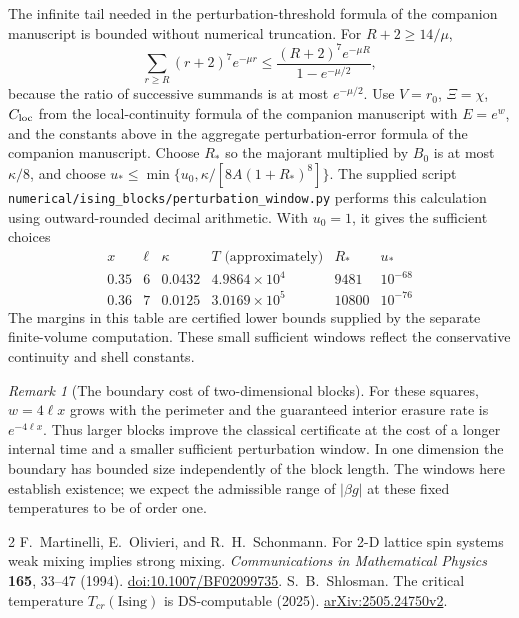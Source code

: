 \documentclass[11pt,a4paper]{article}
\theoremstyle{remark}
\newtheorem{remark}{Remark}[section]
\begin{document}
The infinite tail needed in the perturbation-threshold formula of the companion manuscript is bounded
without numerical truncation. For $R+2\ge14/\mu$,
\begin{equation}
 \sum_{r\ge R}(r+2)^7e^{-\mu r}
 \le\frac{(R+2)^7e^{-\mu R}}{1-e^{-\mu/2}},
 \label{app:ising-tail-majorant}
\end{equation}
because the ratio of successive summands is at most $e^{-\mu/2}$.
Use $V=r_0$, $\Xi=\chi$, $C_{\rm loc}$ from
the local-continuity formula of the companion manuscript with $E=e^w$, and the constants above in
the aggregate perturbation-error formula of the companion manuscript. Choose $R_*$ so the majorant multiplied by $B_0$
is at most $\kappa/8$, and choose
$u_*\le\min\{u_0,\kappa/[8A(1+R_*)^8]\}$.
The supplied script \texttt{numerical/ising\_blocks/perturbation\_window.py}
performs this calculation using outward-rounded decimal arithmetic.
With $u_0=1$, it gives the sufficient choices
\[
 \begin{array}{c|c|c|c|c|c}
  x&\ell&\kappa&T\text{ (approximately)}&R_*&u_*\\\hline
  0.35&6&0.0432&4.9864\times10^4&9481&10^{-68}\\
  0.36&7&0.0125&3.0169\times10^5&10800&10^{-76}
 \end{array}
\]
The margins in this table are certified lower bounds supplied by the
separate finite-volume computation. These small sufficient windows
reflect the conservative continuity and shell constants.

\begin{remark}[The boundary cost of two-dimensional blocks]
For these squares, $w=4\ell x$ grows with the perimeter and the
guaranteed interior erasure rate is $e^{-4\ell x}$. Thus larger
blocks improve the classical certificate at the cost of a longer
internal time and a smaller sufficient perturbation window.
In one dimension the boundary has bounded size independently of
the block length. The windows here establish existence; we expect
the admissible range of $|\beta g|$ at these fixed temperatures
to be of order one.
\end{remark}

\begin{thebibliography}{2}
 F.~Martinelli, E.~Olivieri, and R.~H.~Schonmann.
For 2-D lattice spin systems weak mixing implies strong mixing.
\emph{Communications in Mathematical Physics} \textbf{165}, 33--47 (1994).
\href{https://doi.org/10.1007/BF02099735}{doi:10.1007/BF02099735}.
 S.~B.~Shlosman.
The critical temperature $T_{cr}(\mathrm{Ising})$ is DS-computable (2025).
\href{https://arxiv.org/abs/2505.24750v2}{arXiv:2505.24750v2}.
\end{thebibliography}
\end{document}
